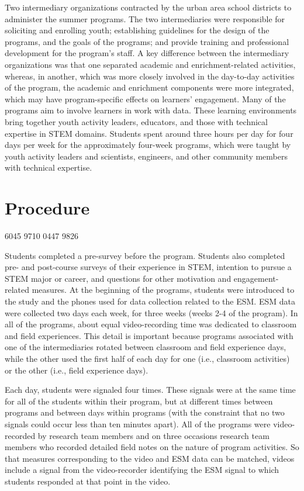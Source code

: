\documentclass[]{book}
\theoremstyle{definition}
\theoremstyle{definition}
\theoremstyle{definition}
\theoremstyle{remark}
\begin{document}
Two intermediary organizations contracted by the urban area school
districts to administer the summer programs. The two intermediaries were
responsible for soliciting and enrolling youth; establishing guidelines
for the design of the programs, and the goals of the programs; and
provide training and professional development for the program's staff. A
key difference between the intermediary organizations was that one
separated academic and enrichment-related activities, whereas, in
another, which was more closely involved in the day-to-day activities of
the program, the academic and enrichment components were more
integrated, which may have program-specific effects on learners'
engagement. Many of the programs aim to involve learners in work with
data. These learning environments bring together youth activity leaders,
educators, and those with technical expertise in STEM domains. Students
spent around three hours per day for four days per week for the
approximately four-week programs, which were taught by youth activity
leaders and scientists, engineers, and other community members with
technical expertise.

\section{Procedure}\label{procedure}

6045 9710 0447 9826

Students completed a pre-survey before the program. Students also
completed pre- and post-course surveys of their experience in STEM,
intention to pursue a STEM major or career, and questions for other
motivation and engagement-related measures. At the beginning of the
programs, students were introduced to the study and the phones used for
data collection related to the ESM. ESM data were collected two days
each week, for three weeks (weeks 2-4 of the program). In all of the
programs, about equal video-recording time was dedicated to classroom
and field experiences. This detail is important because programs
associated with one of the intermediaries rotated between classroom and
field experience days, while the other used the first half of each day
for one (i.e., classroom activities) or the other (i.e., field
experience days).

Each day, students were signaled four times. These signals were at the
same time for all of the students within their program, but at different
times between programs and between days within programs (with the
constraint that no two signals could occur less than ten minutes apart).
All of the programs were video-recorded by research team members and on
three occasions research team members who recorded detailed field notes
on the nature of program activities. So that measures corresponding to
the video and ESM data can be matched, videos include a signal from the
video-recorder identifying the ESM signal to which students responded at
that point in the video.
\end{document}
